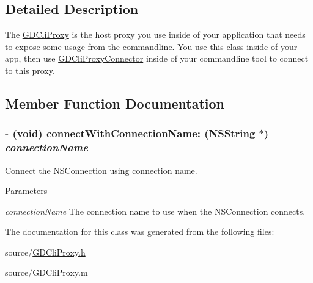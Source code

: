 \subsection{Detailed Description}
The \hyperlink{interface_g_d_cli_proxy}{GDCliProxy} is the host proxy you use inside of your application that needs to expose some usage from the commandline. You use this class inside of your app, then use \hyperlink{interface_g_d_cli_proxy_connector}{GDCliProxyConnector} inside of your commandline tool to connect to this proxy. 

\subsection{Member Function Documentation}
\hypertarget{interface_g_d_cli_proxy_a85ab4f8aa2ea3b04acde87809e2b3c96}{
\subsubsection[{connectWithConnectionName:}]{\setlength{\rightskip}{0pt plus 5cm}-\/ (void) connectWithConnectionName: ({\bf NSString} $\ast$) {\em connectionName}}}
\label{interface_g_d_cli_proxy_a85ab4f8aa2ea3b04acde87809e2b3c96}


Connect the NSConnection using connection name. 
\begin{DoxyParams}{Parameters}
\item[{\em connectionName}]The connection name to use when the NSConnection connects. \end{DoxyParams}


The documentation for this class was generated from the following files:\begin{DoxyCompactItemize}
\item 
source/\hyperlink{_g_d_cli_proxy_8h}{GDCliProxy.h}\item 
source/GDCliProxy.m\end{DoxyCompactItemize}

